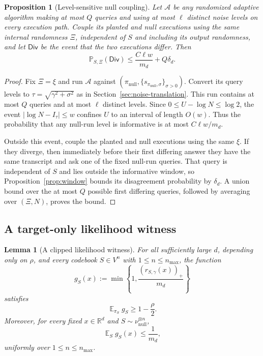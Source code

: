 \documentclass[11pt,letterpaper]{article}
\newtheorem{lemma}[theorem]{Lemma}
\newtheorem{proposition}[theorem]{Proposition}
\newcommand{\R}{\mathbb{R}}
\DeclareMathOperator*{\E}{\mathbb{E}}
\newcommand{\1}{\mathbbm{1}}
\newcommand{\Prob}{\mathbb P}
\begin{document}
\begin{proposition}[Level-sensitive null coupling]
\label{prop:blind-output}
Let \(\mathcal A\) be any randomized adaptive algorithm making at most
\(Q\) queries and using at most \(\ell\) distinct noise levels on every execution
path.  Couple its planted and null executions using the same internal
randomness \(\Xi\), independent of \(S\) and including its output
randomness, and let \(\mathsf{Div}\) be the event that the two executions
differ.  Then
\[
   \Prob_{S,\Xi}(\mathsf{Div})
   \le\frac{C\ell w}{m_d}+Q\delta_d.
\]
\end{proposition}

\begin{proof}
Fix \(\Xi=\xi\) and run \(\mathcal A\) against
\((\pi_{\mathrm{null}},\{s_{\pi_{\mathrm{null}},\sigma}\}_{\sigma>0})\).
Convert its query levels to \(\tau=\sqrt{\gamma^2+\sigma^2}\)
as in Section~\ref{sec:noise-translation}.  This run contains at most
\(Q\) queries and at most \(\ell\) distinct levels.  Since
\(0\le U-\log N\le\log2\), the event
\(|\log N-I_\tau|\le w\) confines \(U\) to an interval of length
\(O(w)\).  Thus the probability that any null-run level is
informative is at most \(C\ell w/m_d\).

Outside this event, couple the planted and null executions using the
same \(\xi\).  If they diverge, then immediately before their first
differing answer they have the same transcript and ask one of the
fixed null-run queries.  That query is independent of \(S\) and lies
outside the informative window, so Proposition~\ref{prop:window}
bounds its disagreement probability by \(\delta_d\).  A union bound
over the at most \(Q\) possible first differing queries, followed by
averaging over \((\Xi,N)\), proves the bound.
\end{proof}

\subsection{A target-only likelihood witness}
\label{sec:tv-separation}

\begin{lemma}[A clipped likelihood witness]\label{lem:tv-exposure}
For all sufficiently large \(d\), depending only on \(\rho\), and
every codebook \(S\in V^n\) with \(1\le n\le n_{\max}\), the function
\[
   g_S(x):=\min\left\{1,\frac{(r_{S,\gamma}(x))_+}{m_d}\right\}
\]
satisfies
\[
   \E_{\pi_S}g_S\ge1-\frac\rho2.
\]
Moreover, for every fixed \(x\in\R^d\) and
\(S\sim\nu_{\mathrm{null}}^{\otimes n}\),
\[
   \E_S g_S(x)\le\frac1{m_d},
\]
uniformly over \(1\le n\le n_{\max}\).
\end{lemma}
\end{document}
